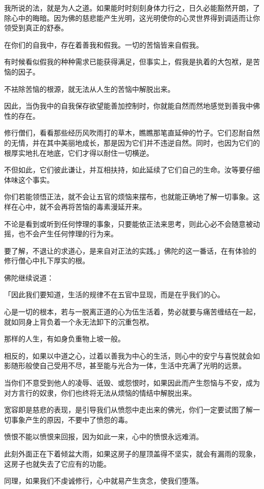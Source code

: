 \documentclass[twoside,openany]{book}
\begin{document}
我所说的法，就是为人之道。如果能时时刻刻身体力行之，日久必能豁然开朗，了除心中的晦暗。因为佛的慈悲能产生光明，这光明使你的心灵世界得到调适而让你领受到真正的舒泰。

在你们的自我中，存在着善我和假我。一切的苦恼皆来自假我。

有时候看似假我的种种需求已能获得满足，但事实上，假我是执着的大包袱，是苦恼的因子。

不袪除苦恼的根源，就无法从人生的苦恼中解脱出来。

因此，当伪我中的自我保存欲望能善加控制时，你就能自然而然地感觉到善我中佛性的存在。

修行僧们，看看那些经历风吹雨打的草木，瞧瞧那笔直延伸的竹子。它们忍耐自然的无情，并在其中美丽地成长，那是因为它们并不违逆自然。同时，也因为它们的根厚实地扎在地底，它们才得以耐住一切横逆。

不但如此，它们彼此谦让，并互相扶持，如此延续了它们自己的生命。汝等要仔细体味这个事实。

你们若能领悟正法，就不会让五官的烦恼来摆布，也就能正确地了解一切事象。这样在心中，就不会再将苦恼的毒素漫延开来。

不论是看到或听到任何悖理的事象，只要能依正法来思考，则此心必不会随意被动摇，也不会产生任何悖理的行为来。

要了解，不退让的求道心，是来自对正法的实践。」佛陀的这一番话，在有体验的修行僧心中扎下厚实的根。

佛陀继续说道：

「因此我们要知道，生活的规律不在五官中显现，而是在乎我们的心。

心是一切的根本，若与一脱离正道的心为伍生活着，势必就要与痛苦缠结在一起，就如同身上背负着一个永无法卸下的沉重包袱。

那样的人生，有如身负重物上坡一般。

相反的，如果以中道之心，过着以善我为中心的生活，则心中的安宁与喜悦就会如影随形般使自己受用不尽，甚至能与光合为一体，生活中充满了光明的远景。

当你们不意受到他人的凌辱、诋毁、或怨恨时，如果因此而产生怨恼与不安，成为对方言行的奴隶，你们也终将无法从烦恼的情结中解脱出来。

宽容即是慈悲的表现，是引导我们从愤怨中走出来的佛光，你们一定要试图了解一切事象产生的原因，不要中了愤怨的毒。

愤恨不能以愤恨来回报，因为如此一来，心中的愤恨永远难消。

此刻外面正在下着倾盆大雨，如果这房子的屋顶盖得不坚实，就会有漏雨的现象，这房子也就失去了它应有的功能。

同理，如果我们不虔诚修行，心中就易产生贪念，使我们堕落。
\end{document}
